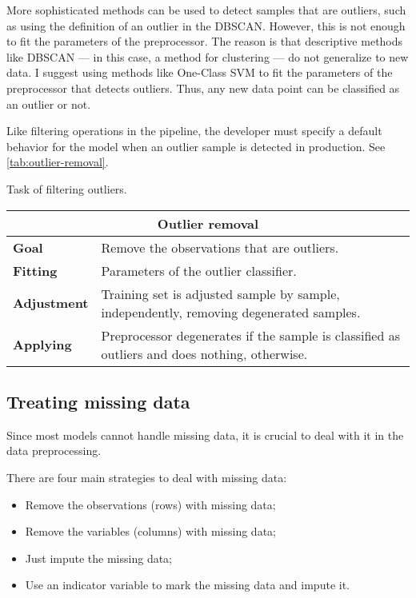More sophisticated methods can be used to detect samples that are outliers, such as using
the definition of an outlier in the DBSCAN.  However, this is not
enough to fit the parameters of the preprocessor.  The reason is that descriptive methods
like DBSCAN  --- in this case, a method for clustering --- do not generalize to new data.
I suggest using methods like One-Class SVM to fit the
parameters of the preprocessor that detects outliers.  Thus, any new data point can
be classified as an outlier or not.

Like filtering operations in the pipeline, the developer must specify a default behavior
for the model when an outlier sample is detected in production.  See
\cref{tab:outlier-removal}.

\begin{tablebox}[label=tab:outlier-removal]{Task of filtering outliers.}
  \centering
  \begin{tabular}{lp{6cm}}
    \toprule
    \multicolumn{2}{c}{\textbf{Outlier removal}} \\
    \midrule
    \textbf{Goal} &
      Remove the observations that are outliers. \\
    \textbf{Fitting} &
      Parameters of the outlier classifier. \\
    \textbf{Adjustment} &
      Training set is adjusted sample by sample, independently, removing
      degenerated samples. \\
    \textbf{Applying} &
      Preprocessor degenerates if the sample is classified as outliers and does
      nothing, otherwise. \\
    \bottomrule
  \end{tabular}
\end{tablebox}

\subsection{Treating missing data}

Since most models cannot handle missing data, it is crucial to deal with it in the data
preprocessing.

There are four main strategies to deal with missing data:
\begin{itemize}
  \itemsep0em
  \item Remove the observations (rows) with missing data;
  \item Remove the variables (columns) with missing data;
  \item Just impute the missing data;
  \item Use an indicator variable to mark the missing data and impute it.
\end{itemize}

